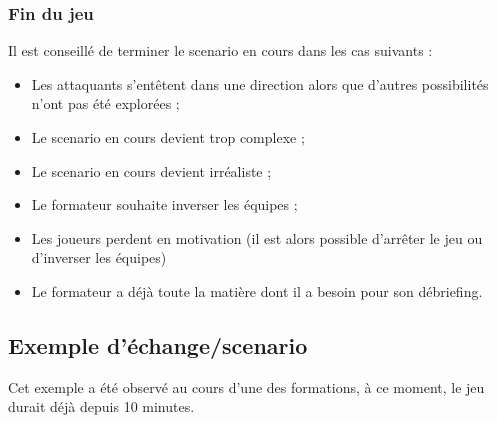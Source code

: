 \documentclass[11pt]{article} %
\begin{document}
\subsubsection{Fin du jeu}
Il est conseillé de terminer le scenario en cours dans les cas suivants : 
\begin{itemize}
\item Les attaquants s'entêtent dans une direction alors que d'autres
possibilités n'ont pas été explorées ;
\item	Le scenario en cours devient trop complexe ; 
\item	Le scenario en cours devient irréaliste ; 
\item	Le formateur souhaite inverser les équipes ; 
\item Les joueurs perdent en motivation (il est alors possible d'arrêter le jeu
ou d'inverser les équipes)
\item	Le formateur a déjà toute la matière dont il a besoin pour son débriefing.\end{itemize}

\subsection{Exemple d'échange/scenario}

Cet exemple a été observé au cours d'une des formations, à ce moment, le jeu
durait déjà depuis 10 minutes.
\end{document}
